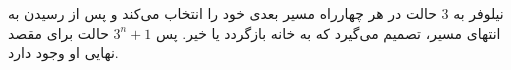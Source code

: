 \p
	نیلوفر به 3 حالت در هر چهارراه مسیر بعدی خود را انتخاب می‌کند و پس از رسیدن به انتهای مسیر، تصمیم می‌گیرد که به خانه بازگردد یا خیر. پس 
	$3^n + 1$
	حالت برای مقصد نهایی او وجود دارد.
	
